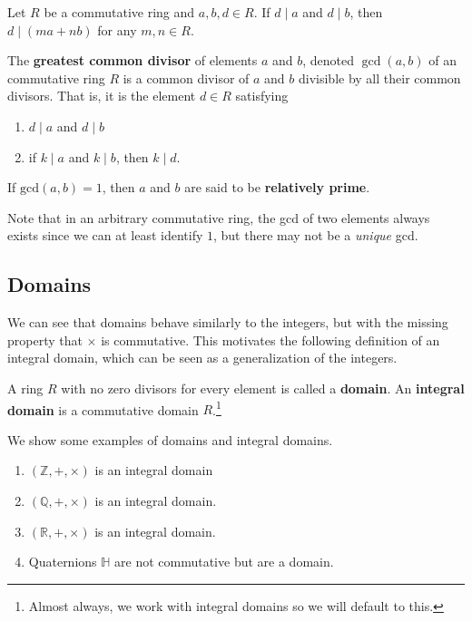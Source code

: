   \begin{lemma}
    Let $R$ be a commutative ring and $a, b, d \in R$. If $d \mid a$ and $d \mid b$, then $d \mid (ma + nb)$ for any $m, n \in R$. 
  \end{lemma} 

  \begin{definition}
    The \textbf{greatest common divisor} of elements $a$ and $b$, denoted $\gcd(a, b)$ of an commutative ring $R$ is a common divisor of $a$ and $b$ divisible by all their common divisors. That is, it is the element $d \in R$ satisfying 
    \begin{enumerate}
      \item $d \mid a$ and $d \mid b$ 
      \item if $k \mid a$ and $k \mid b$, then $k \mid d$. 
    \end{enumerate}
    If $\mathrm{gcd}(a, b) = 1$, then $a$ and $b$ are said to be \textbf{relatively prime}. 
  \end{definition} 

  Note that in an arbitrary commutative ring, the gcd of two elements always exists since we can at least identify $1$, but there may not be a \textit{unique} gcd. 

\subsection{Domains}

  We can see that domains behave similarly to the integers, but with the missing property that $\times$ is commutative. This motivates the following definition of an integral domain, which can be seen as a generalization of the integers. 

  \begin{definition}
    A ring $R$ with no zero divisors for every element is called a \textbf{domain}. An \textbf{integral domain} is a commutative domain $R$.\footnote{Almost always, we work with integral domains so we will default to this.} 
  \end{definition} 

  \begin{example}
    We show some examples of domains and integral domains. 
    \begin{enumerate}
      \item $(\mathbb{Z}, +, \times)$ is an integral domain
      \item $(\mathbb{Q}, +, \times)$ is an integral domain. 
      \item $(\mathbb{R}, +, \times)$ is an integral domain. 
      \item Quaternions $\mathbb{H}$ are not commutative but are a domain. 
    \end{enumerate}
  \end{example} 

